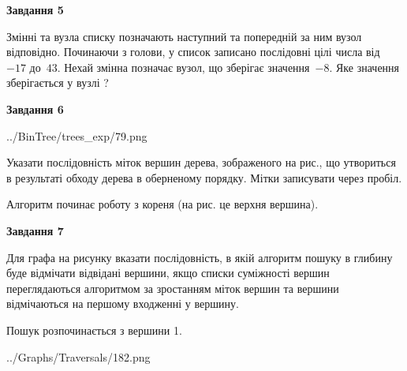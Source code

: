 \documentclass[12pt, ukrainian]{article}
\begin{document}
{\begin {large}
{\begin {center}\textbf{Завдання 5}\end {center}}\par
Змінні  та  вузла списку позначають наступний та попередній за ним вузол відповідно. Починаючи з голови, у список записано послідовні цілі числа від~$-17$ до~$43$. Нехай змінна  позначає вузол, що зберігає значення~$-8$.
Яке значення зберігається у вузлі  ?\par
\newpage

{\begin {center}\textbf{Завдання 6}\end {center}}\par

\begin{center}
	{../BinTree/trees_exp/79.png}
\end{center}
Указати послідовність міток вершин дерева, зображеного на рис., що утвориться в результаті обходу дерева в оберненому порядку. Мітки записувати через пробіл.\par Алгоритм починає роботу з кореня (на рис. це верхня вершина).\par
\newpage

{\begin {center}\textbf{Завдання 7}\end {center}}\par
Для графа на рисунку вказати послідовність, в якій алгоритм пошуку в глибину буде відмічати відвідані вершини, якщо списки суміжності вершин переглядаються алгоритмом за зростанням міток вершин та вершини відмічаються на першому вход\-женні у вершину.\par
Пошук розпочинається з вершини 1.\par

\begin{center}
	{../Graphs/Traversals/182.png}
\end{center}\par
\newpage


\end{large}}
\end{document}
